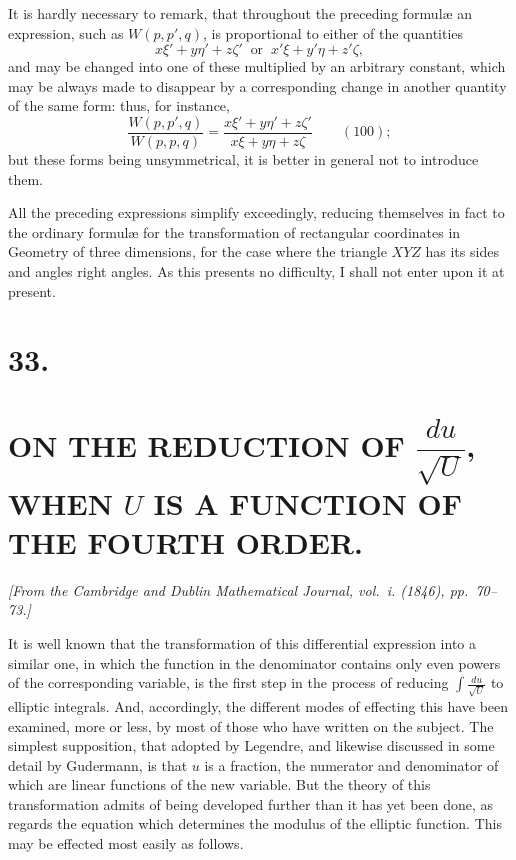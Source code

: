 \documentclass[11pt]{article}
\begin{document}
It is hardly necessary to remark, that throughout the preceding formul\ae{} an expression, such as $W(p, p', q)$, is proportional to either of the quantities
\[
x\xi' + y\eta' + z\zeta'\ \text{ or }\ x'\xi + y'\eta + z'\zeta,
\]
and may be changed into one of these multiplied by an arbitrary constant, which may be always made to disappear by a corresponding change in another quantity of the same form: thus, for instance,
\[
\frac{W(p, p', q)}{W(p, p, q)} = \frac{x\xi' + y\eta' + z\zeta'}{x\xi + y\eta + z\zeta} \qquad (100);
\]
but these forms being unsymmetrical, it is better in general not to introduce them.

All the preceding expressions simplify exceedingly, reducing themselves in fact to the ordinary formul\ae{} for the transformation of rectangular coordinates in Geometry of three dimensions, for the case where the triangle $XYZ$ has its sides and angles right angles. As this presents no difficulty, I shall not enter upon it at present.

\newpage
\section*{33.}
\section*{ON THE REDUCTION OF $\dfrac{du}{\sqrt{U}}$, WHEN $U$ IS A FUNCTION OF THE FOURTH ORDER.}

\textit{[From the Cambridge and Dublin Mathematical Journal, vol.~i. (1846), pp.~70--73.]}

\bigskip
\setcounter{page}{224}

It is well known that the transformation of this differential expression into a similar one, in which the function in the denominator contains only even powers of the corresponding variable, is the first step in the process of reducing $\int \frac{du}{\sqrt{U}}$ to elliptic integrals. And, accordingly, the different modes of effecting this have been examined, more or less, by most of those who have written on the subject. The simplest supposition, that adopted by Legendre, and likewise discussed in some detail by Gudermann, is that $u$ is a fraction, the numerator and denominator of which are linear functions of the new variable. But the theory of this transformation admits of being developed further than it has yet been done, as regards the equation which determines the modulus of the elliptic function. This may be effected most easily as follows.
\end{document}
